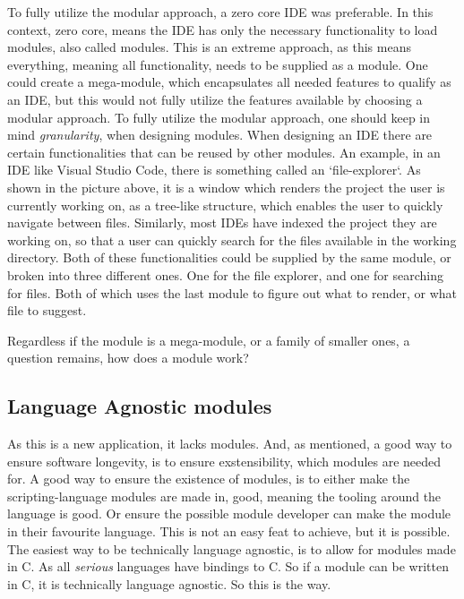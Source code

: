 \documentclass[runningheads]{llncs}
\begin{document}
To fully utilize the modular approach, a zero core IDE was preferable. In this
context, zero core, means the IDE has only the necessary functionality to load
modules, also called modules. This is an extreme approach, as this means
everything, meaning all functionality, needs to be supplied as a module. One
could create a mega-module, which encapsulates all needed features to qualify as
an IDE, but this would not fully utilize the features available by choosing a
modular approach.
To fully utilize the modular approach, one should keep in mind
\textit{granularity}, when designing modules. When designing an IDE there are
certain functionalities that can be reused by other modules. An example, in
an IDE like Visual Studio Code, there is something called an `file-explorer`.
As shown in the picture above, it is a window which renders the project the
user is currently working on, as a tree-like structure, which enables the
user to quickly navigate between files. Similarly, most IDEs have indexed the
project they are working on, so that a user can quickly search for the files
available in the working directory. Both of these functionalities could be
supplied by the same module, or broken into three different ones.
One for the file explorer, and one for searching for files. Both of which uses
the last module to figure out what to render, or what file to suggest.

Regardless if the module is a mega-module, or a family of smaller ones, a
question remains, how does a module work?

\subsection{Language Agnostic modules}
As this is a new application, it lacks modules. And, as mentioned, a good way
to ensure software longevity, is to ensure exstensibility, which modules are
needed for. A good way to ensure the existence of modules, is to either make
the scripting-language modules are made in, good, meaning the tooling around the
language is good. Or ensure the possible module developer can make the module in
their favourite language. This is not an easy feat to achieve, but it is
possible.
The easiest way to be technically language agnostic, is to allow for
modules made in C. As all \textit{serious} languages have bindings to C. So if
a module can be written in C, it is technically language agnostic. So this is
the way.
\end{document}
